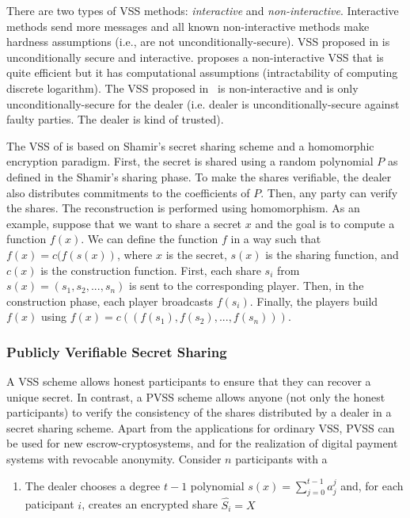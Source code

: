 \documentclass[11pt]{article}
\theoremstyle{plain}
\begin{document}
There are two types of VSS methods: \emph{interactive} and \emph{non-interactive}.
Interactive methods send more messages and all known non-interactive
methods make hardness assumptions (i.e., are not unconditionally-secure).
VSS proposed in \cite{bgw88} is unconditionally secure and interactive.
\cite{Feldman:1987:PSN:1382440.1383000} proposes a non-interactive
VSS that is quite efficient but it has computational assumptions (intractability
of computing discrete logarithm). The VSS proposed in~\cite{pedersen1991threshold}
is non-interactive and is only unconditionally-secure for the dealer
(i.e. dealer is unconditionally-secure against faulty parties. The
dealer is kind of trusted).

The VSS of \cite{Feldman:1987:PSN:1382440.1383000} is based on Shamir's
secret sharing scheme and a homomorphic encryption paradigm. First,
the secret is shared using a random polynomial $P$ as defined in
the Shamir's sharing phase. To make the shares verifiable, the dealer
also distributes commitments to the coefficients of $P$. Then, any
party can verify the shares. The reconstruction is performed using
homomorphism. As an example, suppose that we want to share a secret
$x$ and the goal is to compute a function $f(x)$. We can define
the function $f$ in a way such that $f(x)=c(f(s(x))$, where $x$
is the secret, $s(x)$ is the sharing function, and $c(x)$ is the
construction function. First, each share $s_{i}$ from $s(x)=(s_{1},s_{2},...,s_{n})$
is sent to the corresponding player. Then, in the construction phase,
each player broadcasts $f(s_{i})$. Finally, the players build $f(x)$
using $f(x)=c((f(s_{1}),f(s_{2}),...,f(s_{n})))$.

\subsubsection{Publicly Verifiable Secret Sharing}

A VSS scheme allows honest participants to ensure that they can recover
a unique secret. In contrast, a PVSS scheme allows anyone (not only
the honest participants) to verify the consistency of the shares distributed
by a dealer in a secret sharing scheme. Apart from the applications
for ordinary VSS, PVSS can be used for new escrow-cryptosystems, and
for the realization of digital payment systems with revocable anonymity.
Consider $n$ participants with a 
\begin{enumerate}
	\item The dealer chooses a degree $t-1$ polynomial $s(x)=\sum_{j=0}^{t-1}a_{j}^{j}$
	and, for each paticipant $i$, creates an encrypted share $\hat{S_{i}}=X$ 
\end{enumerate}
\end{document}
